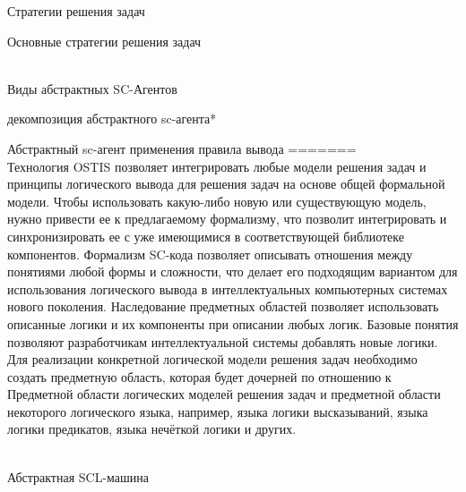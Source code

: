 \begin{frame}{Стратегии решения задач}
\begin{frame}{\large Основные стратегии решения задач}
\begin{textitemize}
\begin{frame}{\\Виды абстрактных SC-Агентов}  
		\begin{scnrelfromset}{декомпозиция абстрактного sc-агента*}
		\end{scnrelfromset}	
\end{frame}

\begin{frame}{\Large Абстрактный sc-агент применения правила вывода}
\vspace{8mm}
=======
    \topline
    \vspace{30}
     \\
     
        Технология OSTIS позволяет интегрировать любые модели решения задач и принципы логического вывода для решения задач на основе общей формальной модели. Чтобы использовать какую-либо новую или существующую модель, нужно привести ее к предлагаемому формализму, что позволит интегрировать и синхронизировать ее с уже имеющимися в соответствующей библиотеке компонентов. Формализм SC-кода позволяет описывать отношения между понятиями любой формы и сложности, что делает его подходящим вариантом для использования логического вывода в интеллектуальных компьютерных системах нового поколения.
        Наследование предметных областей позволяет использовать описанные логики и их компоненты при описании любых логик. Базовые понятия позволяют разработчикам интеллектуальной системы добавлять новые логики. Для реализации конкретной логической модели решения задач необходимо создать предметную область, которая будет дочерней по отношению к Предметной области логических моделей решения задач и предметной области некоторого логического языка, например, языка логики высказываний, языка логики предикатов, языка нечёткой логики и других.
\end{frame}

\begin{frame}{\\Абстрактная SCL-машина}
\topline
\vspace{12mm}
 \\
 

\end{frame}
\end{textitemize}
\end{frame}
\end{frame}
